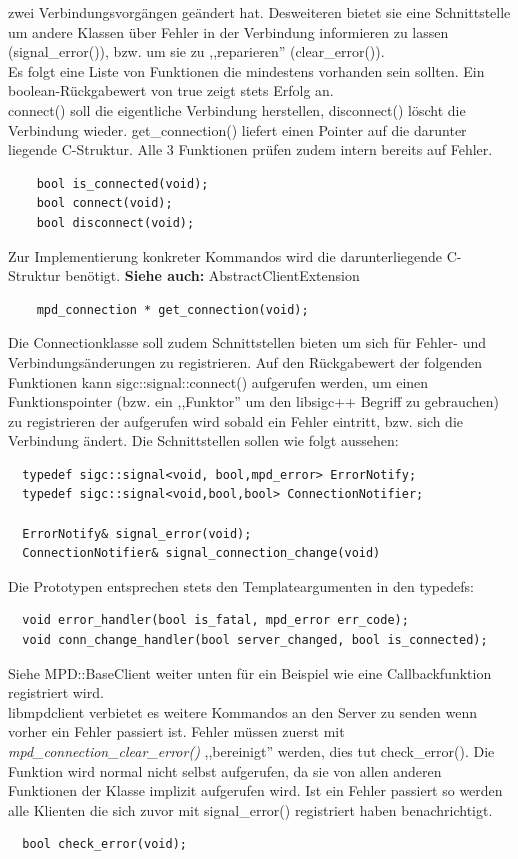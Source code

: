 zwei Verbindungsvorgängen geändert hat. Desweiteren bietet sie eine Schnittstelle um andere Klassen über Fehler in der Verbindung informieren zu lassen (signal\_error()), bzw. um sie zu ,,reparieren'' (clear\_error()).
\\
Es folgt eine Liste von Funktionen die mindestens vorhanden sein sollten.
Ein boolean-Rückgabewert von true zeigt stets Erfolg an.
\\
connect() soll die eigentliche Verbindung herstellen, disconnect() löscht die Verbindung wieder.
get\_connection() liefert einen Pointer auf die darunter liegende C-Struktur.
Alle 3 Funktionen prüfen zudem intern bereits auf Fehler. 
\begin{verbatim}
    bool is_connected(void);
    bool connect(void);
    bool disconnect(void);
\end{verbatim}

Zur Implementierung konkreter Kommandos wird die darunterliegende C-Struktur benötigt.
\textbf{Siehe auch:} AbstractClientExtension
\begin{verbatim}
    mpd_connection * get_connection(void);
\end{verbatim}

Die Connectionklasse soll zudem Schnittstellen bieten um sich für Fehler- und Verbindungsänderungen
zu registrieren. 
Auf den Rückgabewert der folgenden Funktionen kann sigc::signal::connect() aufgerufen werden,
um einen Funktionspointer (bzw. ein ,,Funktor'' um den libsigc++ Begriff zu gebrauchen)
zu registrieren der aufgerufen wird sobald ein Fehler eintritt,
bzw. sich die Verbindung ändert. Die Schnittstellen sollen wie folgt aussehen:
\begin{verbatim}
  typedef sigc::signal<void, bool,mpd_error> ErrorNotify;
  typedef sigc::signal<void,bool,bool> ConnectionNotifier;
    
  ErrorNotify& signal_error(void);
  ConnectionNotifier& signal_connection_change(void)
\end{verbatim}

Die Prototypen entsprechen stets den Templateargumenten in den typedefs:
\begin{verbatim}
  void error_handler(bool is_fatal, mpd_error err_code);
  void conn_change_handler(bool server_changed, bool is_connected); 
\end{verbatim} 

Siehe MPD::BaseClient weiter unten für ein Beispiel wie eine Callbackfunktion registriert wird.
\\
libmpdclient verbietet es weitere Kommandos an den Server zu senden wenn vorher ein Fehler passiert ist.
Fehler müssen zuerst mit \emph{mpd\_connection\_clear\_error()} ,,bereinigt'' werden, 
dies tut check\_error(). Die Funktion wird normal nicht selbst aufgerufen, da sie von allen anderen Funktionen der Klasse
implizit aufgerufen wird. Ist ein Fehler passiert so werden alle Klienten die sich zuvor
mit signal\_error() registriert haben benachrichtigt. 
\begin{verbatim}
  bool check_error(void);
\end{verbatim}


